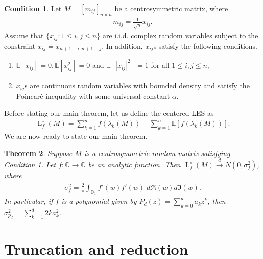 \documentclass[12pt]{amsart}
\theoremstyle{plain}
\newtheorem{Thm}{Theorem}[section]
\theoremstyle{definition}
\newtheorem{matrixcondition}[Thm]{Condition}
\begin{document}
\begin{matrixcondition}\label{cond:matrixcond}
  Let $M=[m_{ij}]_{n\times n}$ be a centrosymmetric matrix, where 
  \begin{align*}
      m_{ij} = \frac{1}{\sqrt{n}}x_{ij}.
  \end{align*}
  Assume that $\{x_{ij}: 1\leq i,j\leq n\}$ are i.i.d. complex random variables subject to the constraint $x_{ij} = x_{n+1-i, n+1-j}$. In addition, $x_{ij}$s satisfy the following conditions.
  \begin{enumerate}[label=(\roman*)]
  \item $\mathbb{E}[x_{ij}] = 0, \mathbb{E}[x_{ij}^2] = 0$ and $\mathbb{E}[|x_{ij}|^2] = 1$ for all $1\leq i, j \leq n,$
  \item $x_{ij}$s are continuous random variables with bounded density and satisfy the Poincaré inequality with some universal constant $\alpha$.
\end{enumerate}
\end{matrixcondition}


Before stating our main theorem, let us define the centered LES as 
\begin{align*}
    \operatorname{L}_{f}^{\circ}(M)=\sum_{k=1}^{n}f(\lambda_{k}(M))-\sum_{k=1}^{n}\mathbb{E}[f(\lambda_{k}(M))].
\end{align*}
We are now ready to state our main theorem.
\begin{Thm}\label{thm: main theorem}
Suppose $M$ is a centrosymmetric random matrix satisfying Condition \ref{cond:matrixcond}. Let $f:\mathbb{C}\to\mathbb{C}$ be an analytic function. Then $\operatorname{L}_{f}^{\circ}(M)\stackrel{d}{\to}N(0, \sigma_{f}^{2})$, where
\begin{align*}
    \sigma_{f}^{2}=\frac{2}{\pi}\int_{\mathbb{D}_{1}}f'(w)\overline{f'(w)}\;d\mathfrak{R}(w)d\mathfrak{I}(w).
\end{align*}
In particular, if $f$ is a polynomial given by $P_{d}(z)=\sum_{k=0}^{d}a_{k}z^{k}$, then $\sigma_{p_d}^2=\sum_{k=1}^{d}2ka_{k}^2$.
\end{Thm}



\section{Truncation and reduction}\label{sec:truncation}
\end{document}
